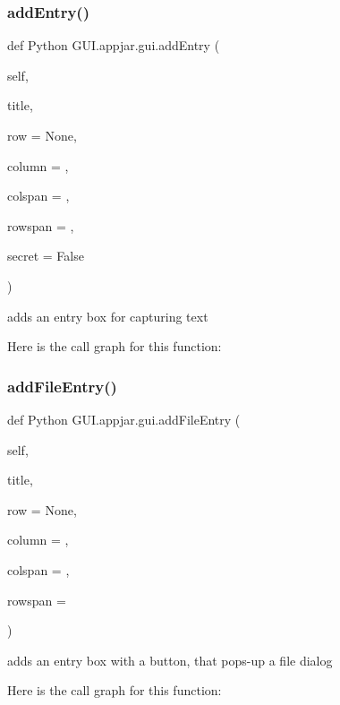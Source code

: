 \subsubsection{\texorpdfstring{add\+Entry()}{addEntry()}}
{\footnotesize\ttfamily def Python G\+U\+I.\+appjar.\+gui.\+add\+Entry (\begin{DoxyParamCaption}\item[{}]{self,  }\item[{}]{title,  }\item[{}]{row = {\ttfamily None},  }\item[{}]{column = {},  }\item[{}]{colspan = {},  }\item[{}]{rowspan = {},  }\item[{}]{secret = {\ttfamily False} }\end{DoxyParamCaption})}

\begin{DoxyVerb}adds an entry box for capturing text \end{DoxyVerb}
 Here is the call graph for this function\+:
\mbox{\label{class_python_01_g_u_i_1_1appjar_1_1gui_a4f9069cff2039494fd9c8d5432576c86}} 
\subsubsection{\texorpdfstring{add\+File\+Entry()}{addFileEntry()}}
{\footnotesize\ttfamily def Python G\+U\+I.\+appjar.\+gui.\+add\+File\+Entry (\begin{DoxyParamCaption}\item[{}]{self,  }\item[{}]{title,  }\item[{}]{row = {\ttfamily None},  }\item[{}]{column = {},  }\item[{}]{colspan = {},  }\item[{}]{rowspan = {} }\end{DoxyParamCaption})}

\begin{DoxyVerb}adds an entry box with a button, that pops-up a file dialog \end{DoxyVerb}
 Here is the call graph for this function\+:
\mbox{\label{class_python_01_g_u_i_1_1appjar_1_1gui_a5ffc357a1387f8a01d331508d9614dc4}} 

